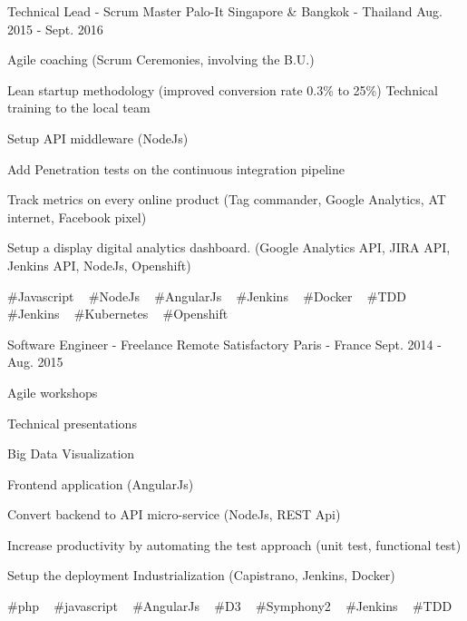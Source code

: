 \begin{cventries}
  \cventry
    {Technical Lead - Scrum Master} %
    {Palo-It} %
    {Singapore \& Bangkok - Thailand} %
    {Aug. 2015 - Sept. 2016} %
    {
      \begin{cvitems} %
        \item {Agile coaching (Scrum Ceremonies, involving the B.U.)}
        \item {Lean startup methodology (improved conversion rate 0.3\% to 25\%) Technical training to the local team}
        \item {Setup API middleware (NodeJs)}
        \item {Add Penetration tests on the continuous integration pipeline}
        \item {Track metrics on every online product (Tag commander, Google Analytics, AT internet, Facebook pixel)}
        \item {Setup a display digital analytics dashboard. (Google Analytics API, JIRA API, Jenkins API, NodeJs, Openshift)}
      \end{cvitems}
    }
    {
      \#Javascript ~
      \#NodeJs ~
      \#AngularJs ~
      \#Jenkins ~
      \#Docker ~
      \#TDD ~
      \#Jenkins ~
      \#Kubernetes ~
      \#Openshift
    }

  \cventry
    {Software Engineer - Freelance Remote} %
    {Satisfactory} %
    {Paris - France} %
    {Sept. 2014 - Aug. 2015} %
    {
      \begin{cvitems} %
        \item {Agile workshops}
        \item {Technical presentations}
        \item {Big Data Visualization}
        \item {Frontend application (AngularJs)}
        \item {Convert backend to API micro-service (NodeJs, REST Api)}
        \item {Increase productivity by automating the test approach (unit test, functional test)}
        \item {Setup the deployment Industrialization (Capistrano, Jenkins, Docker)}
      \end{cvitems}
    }
    {
      \#php ~
      \#javascript ~
      \#AngularJs ~
      \#D3 ~
      \#Symphony2 ~
      \#Jenkins ~
      \#TDD 
    }


\end{cventries}

